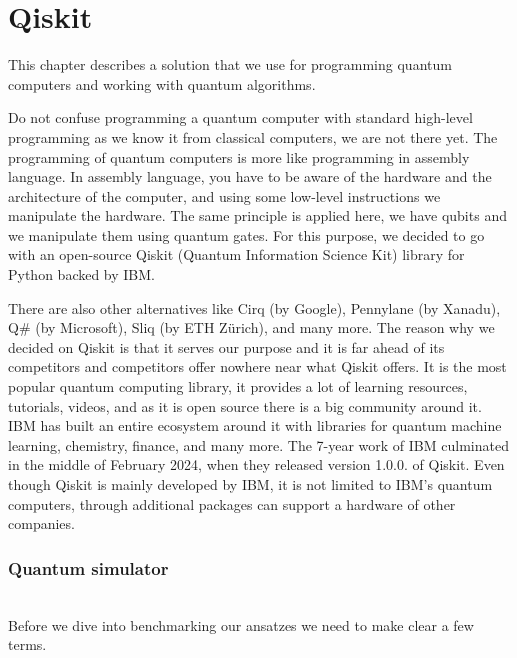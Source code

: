 \chapter{Qiskit}\label{ch:qiskit}
This chapter describes a solution that we use for programming quantum computers and working with quantum algorithms. 

Do not confuse programming a quantum computer with standard high-level programming as we know it from classical computers, we are not there yet. The programming of quantum computers is more like programming in assembly language. In assembly language, you have to be aware of the hardware and the architecture of the computer, and using some low-level instructions we manipulate the hardware. The same principle is applied here, we have qubits and we manipulate them using quantum gates. For this purpose, we decided to go with an open-source Qiskit (Quantum Information Science Kit) library for Python backed by IBM.

There are also other alternatives like Cirq (by Google), Pennylane (by Xanadu), Q\# (by Microsoft), Sliq (by ETH Zürich), and many more.  The reason why we decided on Qiskit is that it serves our purpose and it is far ahead of its competitors and competitors offer nowhere near what Qiskit offers. It is the most popular quantum computing library, it provides a lot of learning resources, tutorials, videos, and as it is open source there is a big community around it. IBM has built an entire ecosystem around it \cite{qiskit_ecosystem} with libraries for quantum machine learning, chemistry, finance, and many more. The 7-year work of IBM culminated in the middle of February 2024, when they released version 1.0.0. of Qiskit. Even though Qiskit is mainly developed by IBM, it is not limited to IBM's quantum computers, through additional packages can support a hardware of other companies.

\subsection{Quantum simulator}



\\
Before we dive into benchmarking our ansatzes we need to make clear a few terms.

